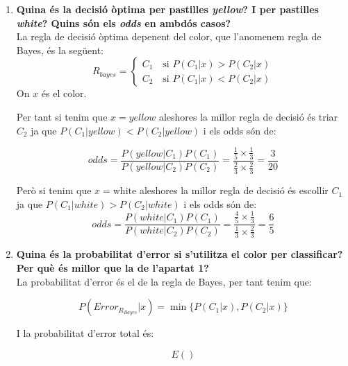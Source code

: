 \documentclass[a4paper]{article}
\begin{document}
\begin{enumerate}
	\item\textbf{ Quina és la decisió òptima per pastilles \textit{yellow}? I per pastilles \textit{white}? Quins són els \textit{odds} en ambdós casos?}\\
	
	 La regla de decisió òptima depenent del color, que l'anomenem regla de Bayes, és la següent:
	$$
	R_{bayes} =
	\begin{cases}
	C_1 \quad \text{si } P(C_1 | x) > P(C_2 | x) \\
	C_2 \quad \text{si } P(C_1 | x) < P(C_2 | x)
	\end{cases}
	$$	
	On $x$ és el color.
	
	Per tant si tenim que $x = \textit{yellow}$ aleshores la millor regla de decisió és triar $C_2$ ja que $P(C_1 | yellow) < P(C_2 | yellow)$ i els odds són de:
	
	$$
	\textit{odds} = \frac{P(yellow | C_1) P(C_1)}{P(yellow | C_2) P(C_2)} = \frac{\frac{1}{5} \times \frac{1}{3}}{\frac{2}{3} \times \frac{2}{3}} = \boxed{\frac{3}{20}}
	$$
	
	Però si tenim que $x = \text{white}$ aleshores la millor regla de decisió és escollir $C_1$ ja que $P(C_1 | white) > P(C_2 | white)$ i els odds són de:
	$$
	\textit{odds} = \frac{P(white | C_1) P(C_1)}{P(white | C_2) P(C_2)} = \frac{\frac{4}{5} \times \frac{1}{3}}{\frac{1}{3} \times \frac{2}{3}} = \boxed{\frac{6}{5}}
	$$
	
	\item\textbf{Quina és la probabilitat d'error si s'utilitza el color per classificar? Per què és millor que la de l'apartat 1?}\\
	
	La probabilitat d'error és el de la regla de Bayes, per tant tenim que:
	
	$$P(Error_{R_{Bayes}} | x) = \min\{P(C_1 | x),P(C_2 | x)\}$$
	
	I la probabilitat d'error total és:
	
	$$
	E()
	$$

\end{enumerate}
\end{document}
